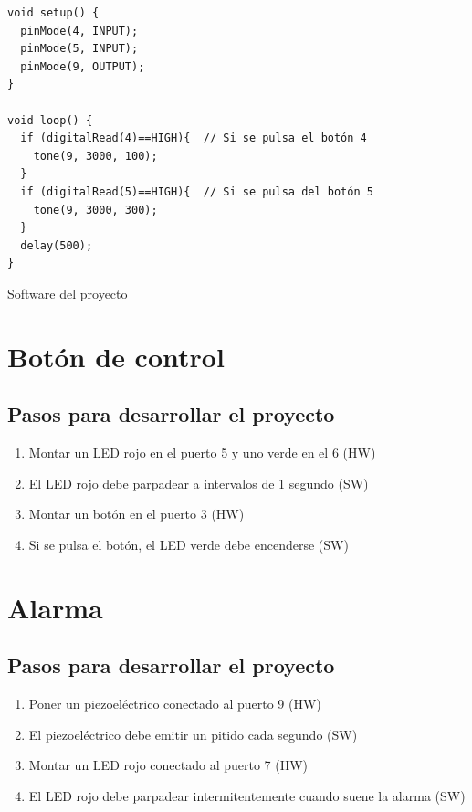 \documentclass[11pt,spanish,a4paper]{article}
\begin{document}
\begin{listing}[H]
\begin{verbatim}
void setup() {
  pinMode(4, INPUT);
  pinMode(5, INPUT);
  pinMode(9, OUTPUT);
}

void loop() {
  if (digitalRead(4)==HIGH){  // Si se pulsa el botón 4
    tone(9, 3000, 100);
  }
  if (digitalRead(5)==HIGH){  // Si se pulsa del botón 5
    tone(9, 3000, 300);
  }
  delay(500);
}
\end{verbatim}
	\caption{Software del proyecto \thesection}
\end{listing}


\newpage
\section{Botón de control}
\subsection{Pasos para desarrollar el proyecto}
\begin{enumerate}
	\item Montar un LED rojo en el puerto 5 y uno verde en el 6 (HW)
	\item El LED rojo debe parpadear a intervalos de 1 segundo (SW)
	\item Montar un botón en el puerto 3 (HW)
	\item Si se pulsa el botón, el LED verde debe encenderse (SW)
\end{enumerate}

\section{Alarma}
\subsection*{Pasos para desarrollar el proyecto}
\begin{enumerate}
	\item Poner un piezoeléctrico conectado al puerto 9 (HW)
	\item El piezoeléctrico debe emitir un pitido cada segundo (SW)
	\item Montar un LED rojo conectado al puerto 7 (HW)
	\item El LED rojo debe parpadear intermitentemente cuando suene la alarma (SW)
\end{enumerate}
\end{document}
